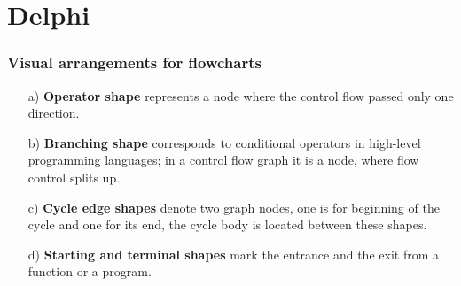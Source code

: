 \documentclass{beamer}
\begin{document}
\section{Delphi}
\begin{frame}
\frametitle{Visual arrangements for flowcharts}
\begin{enumerate}
\item [a)]\textbf{Operator shape} represents a node where the control flow passed only one direction.
\item [b)]\textbf{Branching shape} corresponds to conditional operators in high-level programming languages; in a control flow graph it is a node, where flow control splits up.
\item [c)]\textbf{Cycle edge shapes} denote two graph nodes, one is for beginning of the cycle and one for its end, the cycle body is located between these shapes.
\item [d)]\textbf{Starting and terminal shapes} mark the entrance and the exit from a function or a program.
	\end{enumerate}


\end{frame}
\end{document}
